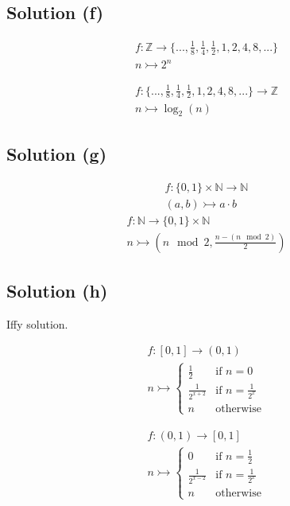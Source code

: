 \documentclass[12pt]{report}
\begin{document}
\subsection{Solution (f)}
\begin{multicols}{2}
    \begin{gather}
        f : \mathbb{Z} \to \{ ..., \frac{1}{8}, \frac{1}{4}, \frac{1}{2}, 1, 2, 4, 8, ... \}\\
        n \rightarrowtail 2^n
    \end{gather}

    \columnbreak
    \begin{gather}
        f : \{ ..., \frac{1}{8}, \frac{1}{4}, \frac{1}{2}, 1, 2, 4, 8, ... \} \to \mathbb{Z}\\
        n \rightarrowtail \log_2 (n)
    \end{gather}
\end{multicols}

\subsection{Solution (g)}
\begin{multicols}{2}
    \begin{gather}
        f : \{0, 1\} \times \mathbb{N} \to \mathbb{N}\\
        (a,b) \rightarrowtail a \cdot b
    \end{gather}
    \columnbreak
    \begin{gather}
        f : \mathbb{N} \to \{0, 1\} \times \mathbb{N}\\
        n \rightarrowtail \left(n \mod 2, \frac{n - (n \mod 2)}{2}\right)
    \end{gather}
\end{multicols}

\subsection{Solution (h)}
Iffy solution. 
\begin{multicols}{2}
    \begin{gather}
        f : [0, 1] \to (0, 1)\\
        n \rightarrowtail \begin{cases}
            \frac{1}{2} & \text{if } n=0\\
            \frac{1}{2^{x+2}} & \text{if } n=\frac{1}{2^x}\\
            n    &   \text{otherwise}
        \end{cases}
    \end{gather}

    \columnbreak
    \begin{gather}
        f : (0, 1) \to [0,1]\\
        n \rightarrowtail \begin{cases}
            0 & \text{if } n=\frac{1}{2}\\
            \frac{1}{2^{x-2}} & \text{if } n=\frac{1}{2^x}\\
            n    &   \text{otherwise}
        \end{cases}
    \end{gather}
\end{multicols}
\end{document}
